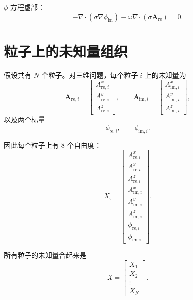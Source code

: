 \documentclass[UTF8,11pt]{ctexart}
\begin{document}
$\phi$ 方程虚部：
\begin{equation}
    -\nabla\cdot(\sigma\nabla \phi_{\mathrm{im}})
    - \omega\nabla\cdot(\sigma\bm A_{\mathrm{re}})
    =
    0 .
    \label{eq:phi-imag}
\end{equation}

\section{粒子上的未知量组织}

假设共有 $N$ 个粒子。对三维问题，每个粒子 $i$ 上的未知量为
\begin{equation}
    \bm A_{\mathrm{re},i}
    =
    \begin{bmatrix}
    A^x_{\mathrm{re},i}\\
    A^y_{\mathrm{re},i}\\
    A^z_{\mathrm{re},i}
    \end{bmatrix},
    \qquad
    \bm A_{\mathrm{im},i}
    =
    \begin{bmatrix}
    A^x_{\mathrm{im},i}\\
    A^y_{\mathrm{im},i}\\
    A^z_{\mathrm{im},i}
    \end{bmatrix},
\end{equation}
以及两个标量
\begin{equation}
    \phi_{\mathrm{re},i},
    \qquad
    \phi_{\mathrm{im},i}.
\end{equation}

因此每个粒子上有 $8$ 个自由度：
\begin{equation}
    X_i
    =
    \begin{bmatrix}
    A^x_{\mathrm{re},i}\\
    A^y_{\mathrm{re},i}\\
    A^z_{\mathrm{re},i}\\
    A^x_{\mathrm{im},i}\\
    A^y_{\mathrm{im},i}\\
    A^z_{\mathrm{im},i}\\
    \phi_{\mathrm{re},i}\\
    \phi_{\mathrm{im},i}
    \end{bmatrix}.
\end{equation}

所有粒子的未知量合起来是
\begin{equation}
    X =
    \begin{bmatrix}
    X_1\\
    X_2\\
    \vdots\\
    X_N
    \end{bmatrix}.
\end{equation}
\end{document}

